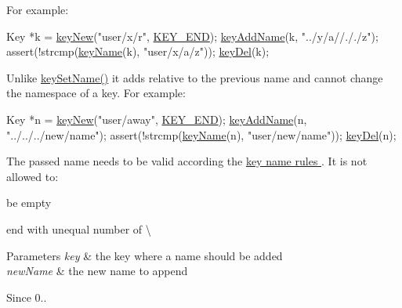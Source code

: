 For example\-: 
\begin{DoxyCodeInclude}
Key *k = \hyperlink{group__key_gad23c65b44bf48d773759e1f9a4d43b89}{keyNew}(\textcolor{stringliteral}{"user/x/r"}, \hyperlink{group__key_gga91fb3178848bd682000958089abbaf40aa8adb6fcb92dec58fb19410eacfdd403}{KEY\_END});
\hyperlink{group__keyname_gaa70593a2c772c4b7bc33423b9b10a270}{keyAddName}(k, \textcolor{stringliteral}{"../y/a//././z"});
assert(!strcmp(\hyperlink{group__keyname_ga8e805c726a60da921d3736cda7813513}{keyName}(k), \textcolor{stringliteral}{"user/x/a/z"}));
\hyperlink{group__key_ga3df95bbc2494e3e6703ece5639be5bb1}{keyDel}(k);
\end{DoxyCodeInclude}
 Unlike \hyperlink{group__keyname_ga7699091610e7f3f43d2949514a4b35d9}{key\-Set\-Name()} it adds relative to the previous name and cannot change the namespace of a key. For example\-: 
\begin{DoxyCodeInclude}
Key *n = \hyperlink{group__key_gad23c65b44bf48d773759e1f9a4d43b89}{keyNew}(\textcolor{stringliteral}{"user/away"}, \hyperlink{group__key_gga91fb3178848bd682000958089abbaf40aa8adb6fcb92dec58fb19410eacfdd403}{KEY\_END});
\hyperlink{group__keyname_gaa70593a2c772c4b7bc33423b9b10a270}{keyAddName}(n, \textcolor{stringliteral}{"../../../new/name"});
assert(!strcmp(\hyperlink{group__keyname_ga8e805c726a60da921d3736cda7813513}{keyName}(n), \textcolor{stringliteral}{"user/new/name"}));
\hyperlink{group__key_ga3df95bbc2494e3e6703ece5639be5bb1}{keyDel}(n);
\end{DoxyCodeInclude}
 The passed name needs to be valid according the \hyperlink{group__keyname}{key name rules }. It is not allowed to\-:
\begin{DoxyItemize}
\item be empty
\item end with unequal number of \textbackslash{}
\end{DoxyItemize}


\begin{DoxyParams}{Parameters}
{\em key} & the key where a name should be added \\
\hline
{\em new\-Name} & the new name to append\\
\hline
\end{DoxyParams}
\begin{DoxySince}{Since}
0..
\end{DoxySince}

